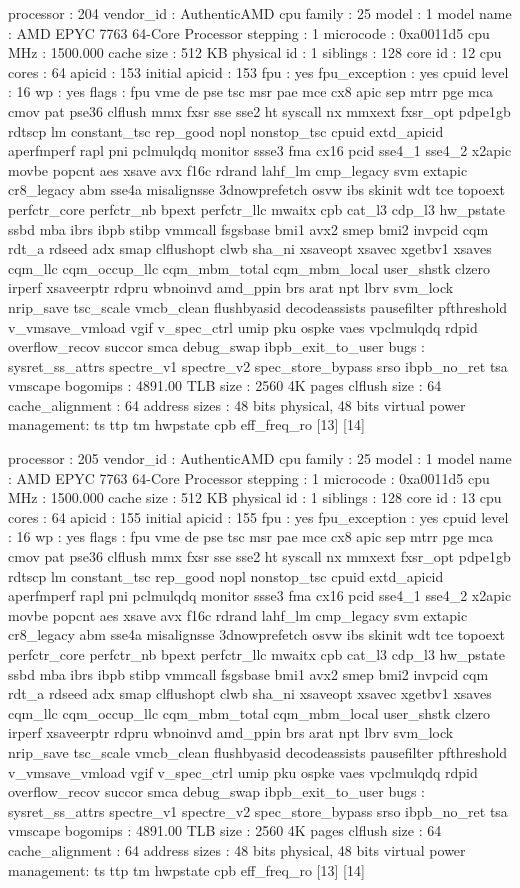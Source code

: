 processor	: 204
vendor_id	: AuthenticAMD
cpu family	: 25
model		: 1
model name	: AMD EPYC 7763 64-Core Processor
stepping	: 1
microcode	: 0xa0011d5
cpu MHz		: 1500.000
cache size	: 512 KB
physical id	: 1
siblings	: 128
core id		: 12
cpu cores	: 64
apicid		: 153
initial apicid	: 153
fpu		: yes
fpu_exception	: yes
cpuid level	: 16
wp		: yes
flags		: fpu vme de pse tsc msr pae mce cx8 apic sep mtrr pge mca cmov pat pse36 clflush mmx fxsr sse sse2 ht syscall nx mmxext fxsr_opt pdpe1gb rdtscp lm constant_tsc rep_good nopl nonstop_tsc cpuid extd_apicid aperfmperf rapl pni pclmulqdq monitor ssse3 fma cx16 pcid sse4_1 sse4_2 x2apic movbe popcnt aes xsave avx f16c rdrand lahf_lm cmp_legacy svm extapic cr8_legacy abm sse4a misalignsse 3dnowprefetch osvw ibs skinit wdt tce topoext perfctr_core perfctr_nb bpext perfctr_llc mwaitx cpb cat_l3 cdp_l3 hw_pstate ssbd mba ibrs ibpb stibp vmmcall fsgsbase bmi1 avx2 smep bmi2 invpcid cqm rdt_a rdseed adx smap clflushopt clwb sha_ni xsaveopt xsavec xgetbv1 xsaves cqm_llc cqm_occup_llc cqm_mbm_total cqm_mbm_local user_shstk clzero irperf xsaveerptr rdpru wbnoinvd amd_ppin brs arat npt lbrv svm_lock nrip_save tsc_scale vmcb_clean flushbyasid decodeassists pausefilter pfthreshold v_vmsave_vmload vgif v_spec_ctrl umip pku ospke vaes vpclmulqdq rdpid overflow_recov succor smca debug_swap ibpb_exit_to_user
bugs		: sysret_ss_attrs spectre_v1 spectre_v2 spec_store_bypass srso ibpb_no_ret tsa vmscape
bogomips	: 4891.00
TLB size	: 2560 4K pages
clflush size	: 64
cache_alignment	: 64
address sizes	: 48 bits physical, 48 bits virtual
power management: ts ttp tm hwpstate cpb eff_freq_ro [13] [14]

processor	: 205
vendor_id	: AuthenticAMD
cpu family	: 25
model		: 1
model name	: AMD EPYC 7763 64-Core Processor
stepping	: 1
microcode	: 0xa0011d5
cpu MHz		: 1500.000
cache size	: 512 KB
physical id	: 1
siblings	: 128
core id		: 13
cpu cores	: 64
apicid		: 155
initial apicid	: 155
fpu		: yes
fpu_exception	: yes
cpuid level	: 16
wp		: yes
flags		: fpu vme de pse tsc msr pae mce cx8 apic sep mtrr pge mca cmov pat pse36 clflush mmx fxsr sse sse2 ht syscall nx mmxext fxsr_opt pdpe1gb rdtscp lm constant_tsc rep_good nopl nonstop_tsc cpuid extd_apicid aperfmperf rapl pni pclmulqdq monitor ssse3 fma cx16 pcid sse4_1 sse4_2 x2apic movbe popcnt aes xsave avx f16c rdrand lahf_lm cmp_legacy svm extapic cr8_legacy abm sse4a misalignsse 3dnowprefetch osvw ibs skinit wdt tce topoext perfctr_core perfctr_nb bpext perfctr_llc mwaitx cpb cat_l3 cdp_l3 hw_pstate ssbd mba ibrs ibpb stibp vmmcall fsgsbase bmi1 avx2 smep bmi2 invpcid cqm rdt_a rdseed adx smap clflushopt clwb sha_ni xsaveopt xsavec xgetbv1 xsaves cqm_llc cqm_occup_llc cqm_mbm_total cqm_mbm_local user_shstk clzero irperf xsaveerptr rdpru wbnoinvd amd_ppin brs arat npt lbrv svm_lock nrip_save tsc_scale vmcb_clean flushbyasid decodeassists pausefilter pfthreshold v_vmsave_vmload vgif v_spec_ctrl umip pku ospke vaes vpclmulqdq rdpid overflow_recov succor smca debug_swap ibpb_exit_to_user
bugs		: sysret_ss_attrs spectre_v1 spectre_v2 spec_store_bypass srso ibpb_no_ret tsa vmscape
bogomips	: 4891.00
TLB size	: 2560 4K pages
clflush size	: 64
cache_alignment	: 64
address sizes	: 48 bits physical, 48 bits virtual
power management: ts ttp tm hwpstate cpb eff_freq_ro [13] [14]

